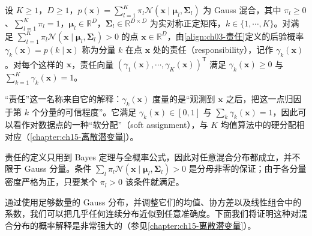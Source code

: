 \documentclass[../../main.tex]{subfiles}
\begin{document}
\begin{definition}[责任]\label{definition:ch03-责任}
设 $K\geqslant1$，$D\geqslant1$，$p(\boldsymbol{x})=\sum_{l=1}^{K}\pi_{l}\mathcal{N}(\boldsymbol{x}\mid\boldsymbol{\mu}_l,\boldsymbol{\Sigma}_l)$ 为 Gauss 混合，其中 $\pi_l\geqslant0$、$\sum_{l=1}^{K}\pi_l=1$，$\boldsymbol{\mu}_l\in\mathbb{R}^{D}$，$\boldsymbol{\Sigma}_l\in\mathbb{R}^{D\times D}$ 为实对称正定矩阵，$k\in\{1,\cdots,K\}$。对满足 $\sum_{l=1}^{K}\pi_l\mathcal{N}(\boldsymbol{x}\mid\boldsymbol{\mu}_l,\boldsymbol{\Sigma}_l)>0$ 的点 $\boldsymbol{x}\in\mathbb{R}^{D}$，由\eqref{align:ch03-责任}定义的后验概率 $\gamma_k(\boldsymbol{x})=p(k\mid\boldsymbol{x})$ 称为分量 $k$ 在点 $\boldsymbol{x}$ 处的责任（responsibility），记作 $\gamma_k(\boldsymbol{x})$。对每个这样的 $\boldsymbol{x}$，责任向量 $(\gamma_1(\boldsymbol{x}),\cdots,\gamma_K(\boldsymbol{x}))^{\mathsf{T}}$ 满足 $\gamma_k(\boldsymbol{x})\geqslant0$ 与 $\sum_{k=1}^{K}\gamma_k(\boldsymbol{x})=1$。
\end{definition}

\begin{remark}
“责任”这一名称来自它的解释：$\gamma_k(\boldsymbol{x})$ 度量的是“观测到 $\boldsymbol{x}$ 之后，把这一点归因于第 $k$ 个分量的可信程度”。它满足 $\gamma_k(\boldsymbol{x})\in[0,1]$ 与 $\sum_k\gamma_k(\boldsymbol{x})=1$，因此可以看作对数据点的一种“软分配”（soft assignment），与 $K$ 均值算法中的硬分配相对应（\cref{chapter:ch15-离散潜变量}）。

责任的定义只用到 Bayes 定理与全概率公式，因此对任意混合分布都成立，并不限于 Gauss 分量。条件 $\sum_l\pi_l\mathcal{N}(\boldsymbol{x}\mid\boldsymbol{\mu}_l,\boldsymbol{\Sigma}_l)>0$ 是分母非零的保证；由于各分量密度严格为正，只要某个 $\pi_l>0$ 该条件就满足。
\end{remark}

通过使用足够数量的 Gauss 分布，并调整它们的均值、协方差以及线性组合中的系数，我们可以把几乎任何连续分布近似到任意准确度。下面我们将证明这种对混合分布的概率解释是非常强大的（参见\cref{chapter:ch15-离散潜变量}）。
\end{document}
